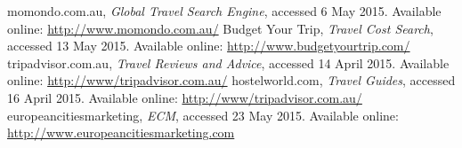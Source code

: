 \documentclass[12pt]{article}
\begin{document}
\pagebreak

\begin{thebibliography}{99}
momondo.com.au,
\emph{Global Travel Search Engine}, accessed 6 May 2015.
Available online: \url{http://www.momondo.com.au/}
Budget Your Trip,
\emph{Travel Cost Search}, accessed 13 May 2015.
Available online: \url{http://www.budgetyourtrip.com/}
tripadvisor.com.au,
\emph{Travel Reviews and Advice}, accessed 14 April 2015.
Available online: \url{http://www/tripadvisor.com.au/}
hostelworld.com,
\emph{Travel Guides}, accessed 16 April 2015.
Available online: \url{http://www/tripadvisor.com.au/}
europeancitiesmarketing,
\emph{ECM}, accessed 23 May 2015.
Available online: \url{http://www.europeancitiesmarketing.com}
\end{thebibliography}




\end{document}
